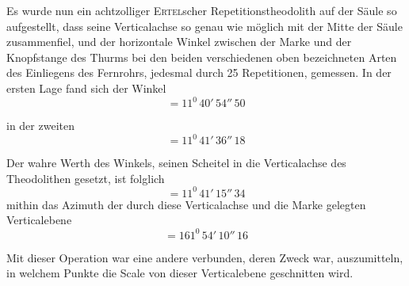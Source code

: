 Es wurde nun ein achtzolliger \textsc{Ertel}scher Repetitionstheodolith auf der Säule so aufgestellt, dass seine Verticalachse so genau wie möglich mit der Mitte der Säule zusammenfiel, und der horizontale Winkel zwischen der Marke und der Knopfstange des Thurms bei den beiden verschiedenen oben bezeichneten Arten des Einliegens des Fernrohrs, jedesmal durch 25 Repetitionen, gemessen. In der ersten Lage fand sich der Winkel
\[
=11^0\,40'\,54''\,50
\]
\par\clearpage
{}
\noindent in der zweiten
\[
=11^0\,41'\,36''\,18
\]

Der wahre Werth des Winkels, seinen Scheitel in die Verticalachse des Theodolithen gesetzt, ist folglich
\[
=11^0\,41'\,15''\,34
\]
mithin das Azimuth der durch diese Verticalachse und die Marke gelegten Verticalebene
\[
=161^0\,54'\,10''\,16
\]

Mit dieser Operation war eine andere verbunden, deren Zweck war, auszumitteln, in welchem Punkte die Scale von dieser Verticalebene geschnitten wird.

